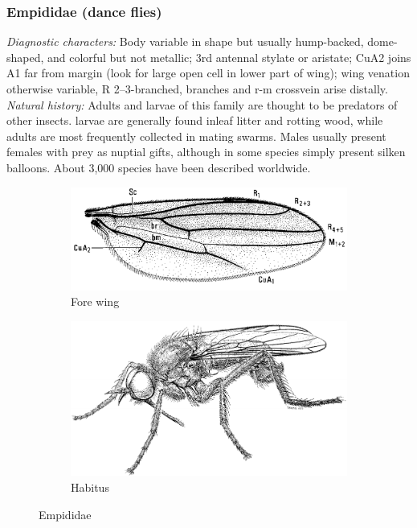 \documentclass[letterpaper, 11pt]{article}
\begin{document}
\subsubsection{Empididae (dance flies)}
\noindent{}\textit{Diagnostic characters:} Body variable in shape but usually hump-backed, dome-shaped, and colorful but not metallic; 3rd antennal stylate or aristate; CuA2 joins A1 far from margin (look for large open cell in lower part of wing); wing venation otherwise variable, R 2--3-branched, branches and r-m crossvein arise distally.\\ %

\noindent{}\textit{Natural history:} Adults and larvae of this family are thought to be predators of other insects. larvae are generally found inleaf litter and rotting wood, while adults are most frequently collected in mating swarms. Males usually present females with prey as nuptial gifts, although in some species simply present silken balloons. About 3,000 species have been described worldwide.

\begin{figure}[ht!]
    \centering
    \begin{subfigure}[ht!]{0.45\textwidth}
        \includegraphics[width=\textwidth]{EmpididWing}
        \caption{Fore wing \citep[][Fig. 47.3]{mcalpine1981manual}}
        \label{fig:empidid1}
    \end{subfigure}
    \qquad
    \begin{subfigure}[ht!]{0.42\textwidth}
        \includegraphics[width=\textwidth]{EmpididHabitus}
        \caption{Habitus \citep[][Fig. 47.1]{mcalpine1981manual}}
        \label{fig:empidid2}
    \end{subfigure}
    \caption{Empididae}\label{fig:empidids}
\end{figure}
\end{document}
